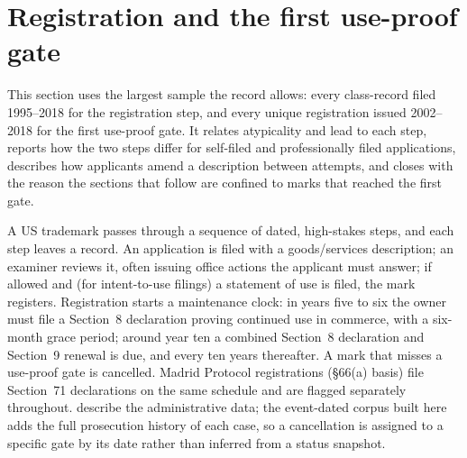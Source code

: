 \section{Registration and the first use-proof gate}\label{sec:life}

This section uses the largest sample the record allows: every class-record
filed 1995--2018 for the registration step, and every unique registration
issued 2002--2018 for the first use-proof gate. It relates atypicality and
lead to each step, reports how the two steps differ for self-filed and
professionally filed applications, describes how applicants amend a
description between attempts, and closes with the reason the sections that
follow are confined to marks that reached the first gate.

A US trademark passes through a sequence of dated, high-stakes steps, and
each step leaves a record. An application is filed with a goods/services
description; an examiner reviews it, often issuing office actions the
applicant must answer; if allowed and (for intent-to-use filings) a
statement of use is filed, the mark registers. Registration starts a
maintenance clock: in years five to six the owner must file a Section~8
declaration proving continued use in commerce, with a six-month grace
period; around year ten a combined Section~8 declaration and Section~9
renewal is due, and every ten years thereafter. A mark that misses a
use-proof gate is cancelled. Madrid Protocol registrations
(\S66(a) basis) file Section~71 declarations on the same schedule and
are flagged separately throughout. \citet{Graham2013} describe the
administrative data; the event-dated corpus built here adds the full
prosecution history of each case, so a cancellation is assigned to a
specific gate by its date rather than inferred from a status snapshot.

